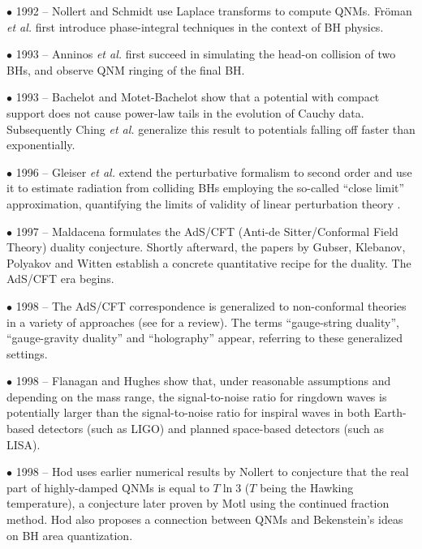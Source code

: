 \documentclass[]{iopart}
\begin{document}
\noindent $\bullet$ 1992 -- Nollert and Schmidt \cite{nollertschmidt} use
Laplace transforms to compute QNMs. Fr\"oman {\it et al.}
\cite{Froeman:1992gp} first introduce phase-integral techniques in the context
of BH physics.

\noindent $\bullet$ 1993 -- Anninos {\it et al.} \cite{Anninos:1993zj} first
succeed in simulating the head-on collision of two BHs, and observe QNM
ringing of the final BH.

\noindent $\bullet$ 1993 -- Bachelot and Motet-Bachelot \cite{Bachelot:1993dp}
show that a potential with compact support does not cause power-law tails in
the evolution of Cauchy data.  Subsequently Ching {\it et al.}
\cite{Ching:1994bd,Ching:1995tj} generalize this result to potentials falling
off faster than exponentially.

\noindent $\bullet$ 1996 -- Gleiser {\it et al.}  \cite{Gleiser:1995gx} extend
the perturbative formalism to second order and use it to estimate radiation
from colliding BHs employing the so-called ``close limit'' approximation,
quantifying the limits of validity of linear perturbation theory
\cite{Gleiser:1996yc}.

\noindent $\bullet$ 1997 -- Maldacena \cite{Maldacena:1997re} formulates the
AdS/CFT (Anti-de Sitter/Conformal Field Theory) duality conjecture. Shortly
afterward, the papers by Gubser, Klebanov, Polyakov \cite{Gubser:1998bc} and
Witten \cite{Witten:1998qj} establish a concrete quantitative recipe for the
duality. The AdS/CFT era begins.

\noindent $\bullet$ 1998 -- The AdS/CFT correspondence is generalized to
non-conformal theories in a variety of approaches (see \cite{Aharony:1999ti}
for a review). The terms ``gauge-string duality'', ``gauge-gravity duality''
and ``holography'' appear, referring to these generalized settings.

\noindent $\bullet$ 1998 -- Flanagan and Hughes \cite{Flanagan:1997sx} show
that, under reasonable assumptions and depending on the mass range, the
signal-to-noise ratio for ringdown waves is potentially larger than the
signal-to-noise ratio for inspiral waves in both Earth-based detectors (such
as LIGO) and planned space-based detectors (such as LISA).

\noindent $\bullet$ 1998 -- Hod \cite{Hod:1998vk} uses earlier numerical
results by Nollert \cite{Nollert:1993} to conjecture that the real part of
highly-damped QNMs is equal to $T \ln 3$ ($T$ being the Hawking temperature),
a conjecture later proven by Motl \cite{Motl:2002hd} using the continued
fraction method.  Hod also proposes a connection between QNMs and Bekenstein's
ideas on BH area quantization.
\end{document}
